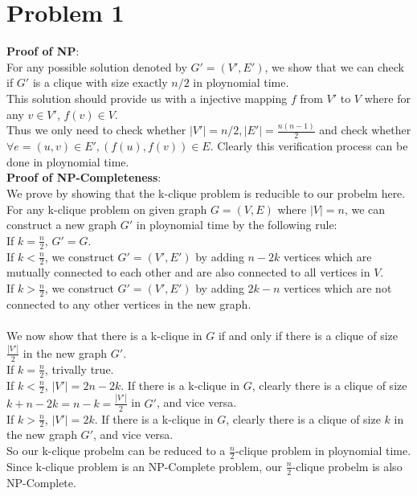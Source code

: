 \documentclass[12pt,letterpaper]{article}
\begin{document}
\section*{Problem 1}
\textbf{Proof of NP}:\\
For any possible solution denoted by $G'=(V',E')$,
we show that we can check if $G'$ is a clique with size exactly $n/2$ in ploynomial time.\\
This solution should provide us with a injective mapping $f$ from $V'$ to $V$
where for any $v\in V'$, $f(v)\in V$.\\
Thus we only need to check whether $|V'|=n/2, |E'|=\frac{n(n-1)}{2}$ and 
check whether $\forall e=(u,v)\in E',(f(u),f(v))\in E$.
Clearly this verification process can be done in ploynomial time.\\
\textbf{Proof of NP-Completeness}:\\
We prove by showing that the k-clique problem is reducible to our probelm here.\\
For any k-clique problem on given graph $G=(V,E)$ where $|V|=n$,
we can construct a new graph $G'$ in ploynomial time by the following rule:\\
If $k=\frac{n}{2}$, $G'=G$.\\
If $k<\frac{n}{2}$, we construct $G'=(V',E')$ by adding $n-2k$ vertices 
which are mutually connected to each other and are also connected to all
vertices in $V$.\\
If $k>\frac{n}{2}$, we construct $G'=(V',E')$ by adding $2k-n$ vertices
which are not connected to any other vertices in the new graph.\\\\
We now show that there is a k-clique in $G$ if and only if 
there is a clique of size $\frac{|V'|}{2}$ in the new graph $G'$.\\
If $k=\frac{n}{2}$, trivally true.\\
If $k<\frac{n}{2}$, $|V'|=2n-2k$. If there is a k-clique in $G$,
clearly there is a clique of size $k+n-2k=n-k=\frac{|V'|}{2}$ in $G'$,
and vice versa.\\
If $k>\frac{n}{2}$, $|V'|=2k$. If there is a k-clique in $G$,
clearly there is a clique of size $k$ in the new graph $G'$, and vice versa.\\
So our k-clique probelm can be reduced to a $\frac{n}{2}$-clique problem in ploynomial time.
Since k-clique problem is an NP-Complete problem,
our $\frac{n}{2}$-clique probelm is also NP-Complete.

\newpage
\end{document}
